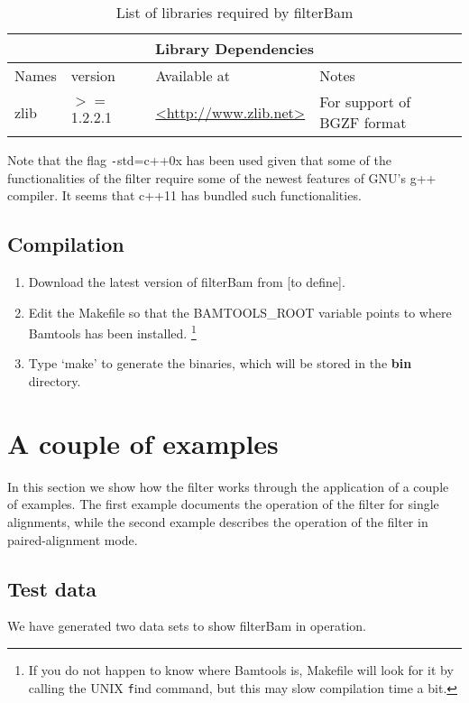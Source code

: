 \documentclass[11pt]{article}
\newcommand{\unix}[1]{\texttt#1}
\begin{document}
{\begin{table}
  \begin{center}
    \begin{tabular}{|l|l|l|l|}
	\hline
	\multicolumn{4}{|c|}{Library Dependencies} \\ \cline{1-4}
	\hline
	  Names		&  version  & Available at	&	Notes\\ \cline{1-4}
	  zlib		&  $>=$ 1.2.2.1 & \url{<http://www.zlib.net>} & For support of BGZF format\\ \cline{1-4}
    \end{tabular}
  \end{center}
  \label{tab:libraries}
  \caption{List of libraries required by filterBam}
\end{table}

Note that the flag \unix{-std=c++0x}  has been used given that some of the functionalities of the filter require 
some of the newest features of GNU's g++ compiler. It seems that c++11 has bundled such functionalities. 

\subsection{Compilation}

\begin{enumerate}
	\item
		Download the latest version of filterBam from [to define].
	\item
		Edit the Makefile so that the BAMTOOLS\_ROOT variable points to where Bamtools has been installed.
		\footnote{If you do not happen to know where Bamtools is, Makefile will look for it by calling the UNIX 
		\unix{find} command, but this may slow compilation time a bit.} 
	\item
		Type `make' to generate the binaries, which will be stored in the \textbf{bin} directory. 
\end{enumerate}

\section{A couple of examples}
In this section we show how the filter works through the application of a couple of examples. The first 
example documents the operation of the filter for single alignments, while the second example describes 
the operation of the filter in paired-alignment mode.

\subsection{Test data}
We have generated two data sets to show filterBam in operation. 

}
\end{document}
